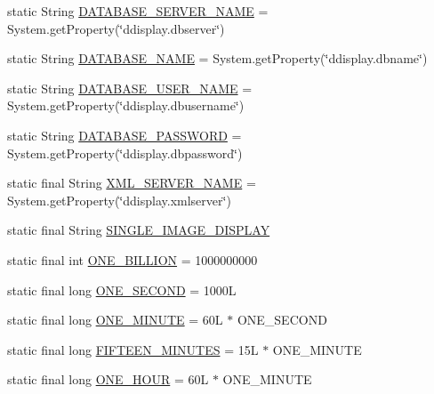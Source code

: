 \begin{DoxyCompactItemize}
\item 
static String \hyperlink{classgov_1_1fnal_1_1ppd_1_1dd_1_1GlobalVariables_a84bb07dcee9c961579282f50a5031c0e}{D\-A\-T\-A\-B\-A\-S\-E\-\_\-\-S\-E\-R\-V\-E\-R\-\_\-\-N\-A\-M\-E} = System.\-get\-Property(\char`\"{}ddisplay.\-dbserver\char`\"{})
\item 
static String \hyperlink{classgov_1_1fnal_1_1ppd_1_1dd_1_1GlobalVariables_a737045676a15c469e5cb486d80c08043}{D\-A\-T\-A\-B\-A\-S\-E\-\_\-\-N\-A\-M\-E} = System.\-get\-Property(\char`\"{}ddisplay.\-dbname\char`\"{})
\item 
static String \hyperlink{classgov_1_1fnal_1_1ppd_1_1dd_1_1GlobalVariables_a1b5c1519d1964bf42b3fe4908ae6d444}{D\-A\-T\-A\-B\-A\-S\-E\-\_\-\-U\-S\-E\-R\-\_\-\-N\-A\-M\-E} = System.\-get\-Property(\char`\"{}ddisplay.\-dbusername\char`\"{})
\item 
static String \hyperlink{classgov_1_1fnal_1_1ppd_1_1dd_1_1GlobalVariables_ae63bd973c9c02683b0c4964179ceefe0}{D\-A\-T\-A\-B\-A\-S\-E\-\_\-\-P\-A\-S\-S\-W\-O\-R\-D} = System.\-get\-Property(\char`\"{}ddisplay.\-dbpassword\char`\"{})
\item 
static final String \hyperlink{classgov_1_1fnal_1_1ppd_1_1dd_1_1GlobalVariables_a1b1eb1c9096380d09b968cd474e8bb86}{X\-M\-L\-\_\-\-S\-E\-R\-V\-E\-R\-\_\-\-N\-A\-M\-E} = System.\-get\-Property(\char`\"{}ddisplay.\-xmlserver\char`\"{})
\item 
static final String \hyperlink{classgov_1_1fnal_1_1ppd_1_1dd_1_1GlobalVariables_ab018dd06fadda0d1bc99e7de66894e84}{S\-I\-N\-G\-L\-E\-\_\-\-I\-M\-A\-G\-E\-\_\-\-D\-I\-S\-P\-L\-A\-Y}
\item 
static final int \hyperlink{classgov_1_1fnal_1_1ppd_1_1dd_1_1GlobalVariables_a271c983add4bac415412025c8ac2f4cc}{O\-N\-E\-\_\-\-B\-I\-L\-L\-I\-O\-N} = 1000000000
\item 
static final long \hyperlink{classgov_1_1fnal_1_1ppd_1_1dd_1_1GlobalVariables_a3718d8133f257fcc337f5131c8e22d48}{O\-N\-E\-\_\-\-S\-E\-C\-O\-N\-D} = 1000\-L
\item 
static final long \hyperlink{classgov_1_1fnal_1_1ppd_1_1dd_1_1GlobalVariables_a79fc1e35198b44168537a85aa4c2d942}{O\-N\-E\-\_\-\-M\-I\-N\-U\-T\-E} = 60\-L $\ast$ O\-N\-E\-\_\-\-S\-E\-C\-O\-N\-D
\item 
static final long \hyperlink{classgov_1_1fnal_1_1ppd_1_1dd_1_1GlobalVariables_ae09d2d42603daf3b4d5fccd1c489a93b}{F\-I\-F\-T\-E\-E\-N\-\_\-\-M\-I\-N\-U\-T\-E\-S} = 15\-L $\ast$ O\-N\-E\-\_\-\-M\-I\-N\-U\-T\-E
\item 
static final long \hyperlink{classgov_1_1fnal_1_1ppd_1_1dd_1_1GlobalVariables_a947f75994e24bb52604adf3699920579}{O\-N\-E\-\_\-\-H\-O\-U\-R} = 60\-L $\ast$ O\-N\-E\-\_\-\-M\-I\-N\-U\-T\-E

\end{DoxyCompactItemize}
